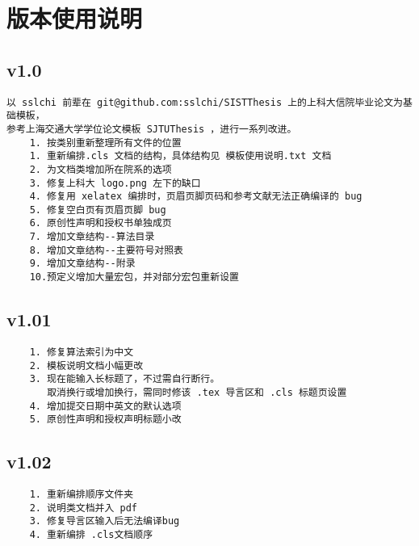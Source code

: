 \chapter{版本使用说明}
\section*{v1.0}
\begin{verbatim}
以 sslchi 前辈在 git@github.com:sslchi/SISTThesis 上的上科大信院毕业论文为基础模板，
参考上海交通大学学位论文模板 SJTUThesis ，进行一系列改进。
    1. 按类别重新整理所有文件的位置
    1. 重新编排.cls 文档的结构，具体结构见 模板使用说明.txt 文档
    2. 为文档类增加所在院系的选项
    3. 修复上科大 logo.png 左下的缺口
    4. 修复用 xelatex 编排时，页眉页脚页码和参考文献无法正确编译的 bug
    5. 修复空白页有页眉页脚 bug
    6. 原创性声明和授权书单独成页
    7. 增加文章结构--算法目录
    8. 增加文章结构--主要符号对照表
    9. 增加文章结构--附录
    10.预定义增加大量宏包，并对部分宏包重新设置
\end{verbatim}

\section*{v1.01}
\begin{verbatim}
    1. 修复算法索引为中文
    2. 模板说明文档小幅更改
    3. 现在能输入长标题了，不过需自行断行。
       取消换行或增加换行，需同时修该 .tex 导言区和 .cls 标题页设置
    4. 增加提交日期中英文的默认选项
    5. 原创性声明和授权声明标题小改
\end{verbatim}

\section*{v1.02}
\begin{verbatim}
    1. 重新编排顺序文件夹
    2. 说明类文档并入 pdf
    3. 修复导言区输入后无法编译bug
    4. 重新编排 .cls文档顺序
\end{verbatim}